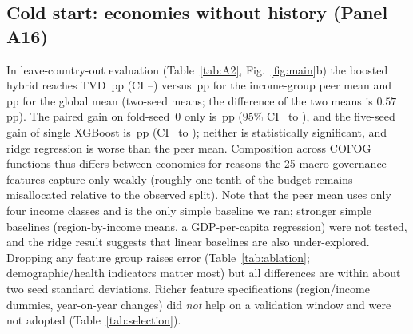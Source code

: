 \figPerfn
\figCovid

\subsection{Cold start: economies without history (Panel A16)}\label{sec:cold}\label{sec:selection}
In leave-country-out evaluation (Table~\ref{tab:A2}, Fig.~\ref{fig:main}b) the boosted hybrid reaches TVD \ResColdHyb\,pp (CI \ResColdHybLo--\ResColdHybHi) versus \ResColdPeer\,pp for the income-group peer mean and \ResColdGlobal\,pp for the global mean (two-seed means; the difference of the two means is $0.57$\,pp). The paired gain on fold-seed~0 only is \ResColdGain\,pp (95\% CI \ResColdGainLo\ to \ResColdGainHi), and the five-seed gain of single XGBoost is \FSXgbSixteenGain\,pp (CI \FSXgbSixteenLo\ to \FSXgbSixteenHi); neither is statistically significant, and ridge regression is worse than the peer mean. Composition across COFOG functions thus differs between economies for reasons the 25 macro-governance features capture only weakly (roughly one-tenth of the budget remains misallocated relative to the observed split). Note that the peer mean uses only four income classes and is the only simple baseline we ran; stronger simple baselines (region-by-income means, a GDP-per-capita regression) were not tested, and the ridge result suggests that linear baselines are also under-explored. Dropping any feature group raises error (Table~\ref{tab:ablation}; demographic/health indicators matter most) but all differences are within about two seed standard deviations. Richer feature specifications (region/income dummies, year-on-year changes) did \emph{not} help on a validation window and were not adopted (Table~\ref{tab:selection}).



